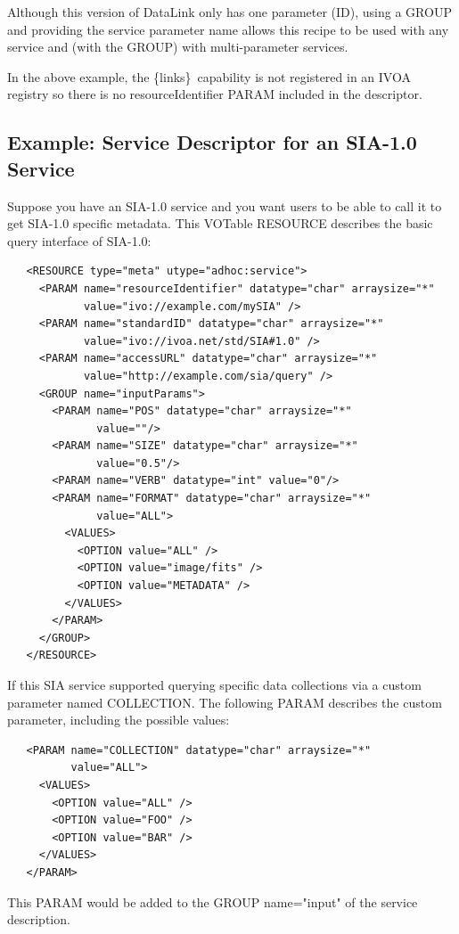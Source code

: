 \documentclass[11pt,a4paper]{ivoa}
\newcommand{\blinks}{\{links\}}
\begin{document}
Although this version of DataLink only has one parameter (ID), using a
GROUP and providing the service parameter name allows this recipe to be
used with any service and (with the GROUP) with multi-parameter services.

In the above example, the \blinks\ capability is not registered in an
IVOA registry so there is no resourceIdentifier PARAM included in the
descriptor.


\subsection{Example: Service Descriptor for an SIA-1.0 Service}

Suppose you have an SIA-1.0 service and you want users to be able to
call it to get SIA-1.0 specific metadata. This VOTable RESOURCE describes
the basic query interface of SIA-1.0:
\begin{verbatim}
   <RESOURCE type="meta" utype="adhoc:service">
     <PARAM name="resourceIdentifier" datatype="char" arraysize="*"
            value="ivo://example.com/mySIA" />
     <PARAM name="standardID" datatype="char" arraysize="*"
            value="ivo://ivoa.net/std/SIA#1.0" />
     <PARAM name="accessURL" datatype="char" arraysize="*"
            value="http://example.com/sia/query" />
     <GROUP name="inputParams">
       <PARAM name="POS" datatype="char" arraysize="*"
              value=""/>
       <PARAM name="SIZE" datatype="char" arraysize="*"
              value="0.5"/>
       <PARAM name="VERB" datatype="int" value="0"/>
       <PARAM name="FORMAT" datatype="char" arraysize="*"
              value="ALL">
         <VALUES>
           <OPTION value="ALL" />
           <OPTION value="image/fits" />
           <OPTION value="METADATA" />
         </VALUES>
       </PARAM>
     </GROUP>
   </RESOURCE>
\end{verbatim}

If this SIA service supported querying specific data collections via
a custom parameter named COLLECTION. The following PARAM describes the
custom parameter, including the possible values:
\begin{verbatim}
   <PARAM name="COLLECTION" datatype="char" arraysize="*"
          value="ALL">
     <VALUES>
       <OPTION value="ALL" />
       <OPTION value="FOO" />
       <OPTION value="BAR" />
     </VALUES>
   </PARAM>
\end{verbatim}
This PARAM would be added to the GROUP name="input" of the service
description.
\end{document}
